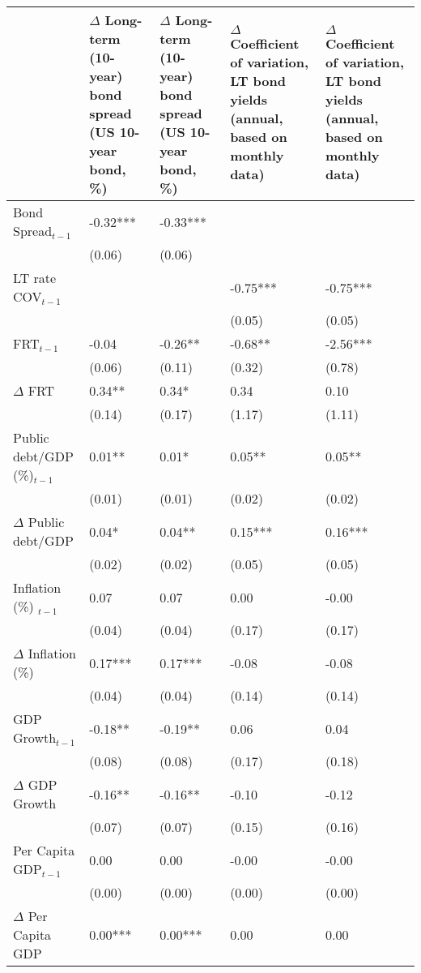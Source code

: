 \begingroup\tiny
\begin{tabular}{lp{3cm}p{3cm}p{3cm}p{3cm}}
  \hline
 & $\Delta$ Long-term (10-year) bond spread (US 10-year bond, \%) & $\Delta$ Long-term (10-year) bond spread (US 10-year bond, \%) & $\Delta$ Coefficient of variation, LT bond yields (annual, based on monthly data) & $\Delta$ Coefficient of variation, LT bond yields (annual, based on monthly data) \\ 
  \hline
Bond Spread$_{t-1}$ & -0.32*** & -0.33*** &  &  \\ 
   & (0.06) & (0.06) &  &  \\ 
  LT rate COV$_{t-1}$ &  &  & -0.75*** & -0.75*** \\ 
   &  &  & (0.05) & (0.05) \\ 
  FRT$_{t-1}$ & -0.04 & -0.26** & -0.68** & -2.56*** \\ 
   & (0.06) & (0.11) & (0.32) & (0.78) \\ 
  $\Delta$ FRT & 0.34** & 0.34* & 0.34 & 0.10 \\ 
   & (0.14) & (0.17) & (1.17) & (1.11) \\ 
  Public debt/GDP (\%)$_{t-1}$ & 0.01** & 0.01* & 0.05** & 0.05** \\ 
   & (0.01) & (0.01) & (0.02) & (0.02) \\ 
  $\Delta$ Public debt/GDP & 0.04* & 0.04** & 0.15*** & 0.16*** \\ 
   & (0.02) & (0.02) & (0.05) & (0.05) \\ 
  Inflation (\%) $_{t-1}$ & 0.07 & 0.07 & 0.00 & -0.00 \\ 
   & (0.04) & (0.04) & (0.17) & (0.17) \\ 
  $\Delta$ Inflation (\%) & 0.17*** & 0.17*** & -0.08 & -0.08 \\ 
   & (0.04) & (0.04) & (0.14) & (0.14) \\ 
  GDP Growth$_{t-1}$ & -0.18** & -0.19** & 0.06 & 0.04 \\ 
   & (0.08) & (0.08) & (0.17) & (0.18) \\ 
  $\Delta$ GDP Growth & -0.16** & -0.16** & -0.10 & -0.12 \\ 
   & (0.07) & (0.07) & (0.15) & (0.16) \\ 
  Per Capita GDP$_{t-1}$ & 0.00 & 0.00 & -0.00 & -0.00 \\ 
   & (0.00) & (0.00) & (0.00) & (0.00) \\ 
  $\Delta$ Per Capita GDP & 0.00*** & 0.00*** & 0.00 & 0.00 \\ 

\end{tabular}
